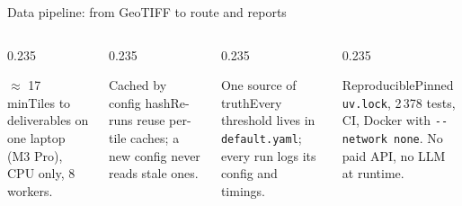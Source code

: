 \documentclass[aspectratio=169, 11pt, t]{beamer}
\begin{document}
\begin{frame}{Data pipeline: from GeoTIFF to route and reports}
  \vspace{6mm}
  \begin{columns}[T]
    \begin{column}{0.235\textwidth}\begin{sxcard}{$\approx$ 17 min}Tiles to deliverables on one laptop (M3 Pro), CPU only, 8 workers.\end{sxcard}\end{column}
    \begin{column}{0.235\textwidth}\begin{sxcard}{Cached by config hash}Re-runs reuse per-tile caches; a new config never reads stale ones.\end{sxcard}\end{column}
    \begin{column}{0.235\textwidth}\begin{sxcard}{One source of truth}Every threshold lives in \texttt{default.yaml}; every run logs its config and timings.\end{sxcard}\end{column}
    \begin{column}{0.235\textwidth}\begin{sxcard}{Reproducible}Pinned \texttt{uv.lock}, 2\,378 tests, CI, Docker with \texttt{-{}-network none}. No paid API, no LLM at runtime.\end{sxcard}\end{column}
  \end{columns}
\end{frame}
\end{document}

